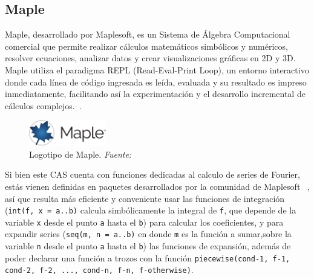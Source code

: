 \subsection{Maple}
Maple, desarrollado por Maplesoft, es un Sistema de Álgebra Computacional comercial que permite realizar cálculos matemáticos simbólicos y numéricos, resolver ecuaciones, analizar datos y crear visualizaciones gráficas en 2D y 3D. Maple utiliza el paradigma REPL (Read-Eval-Print Loop), un entorno interactivo donde cada línea de código ingresada es leída, evaluada y su resultado es impreso inmediatamente, facilitando así la experimentación y el desarrollo incremental de cálculos complejos.~\cite{maple2024}.
\begin{figure}[H]
	\centering
	\includegraphics[width=0.3\textwidth]{img/chapter02/logo_maple.png}
	\caption[Logotipo de Maple.]{Logotipo de Maple. \textit{Fuente: ~\cite{maple2024}}}
	\label{fig:logo-maple}  %
\end{figure}
Si bien este CAS cuenta con funciones dedicadas al calculo de series de Fourier, estás vienen definidas en paquetes desarrollados por la comunidad de Maplesoft ~\cite{mapleFourier}, así que resulta más eficiente y conveniente usar las funciones de integración (\texttt{int(f, x = a..b)} calcula simbólicamente la integral de \texttt{f}, que depende de la variable \texttt{x} desde el punto \texttt{a} hasta el \texttt{b}) para calcular los coeficientes, y para expandir series (\texttt{seq(m, n = a..b)} en donde \texttt{m} es la función a sumar,sobre la variable \texttt{n} desde el punto \texttt{a} hasta el \texttt{b}) las funciones de expansión, además de poder declarar una función a trozos con la función \texttt{piecewise(cond-1, f-1, cond-2, f-2, ..., cond-n, f-n, f-otherwise)}.

